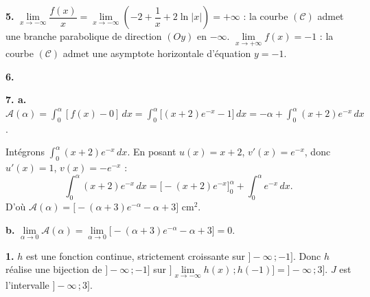 \documentclass[11pt]{article}
\begin{document}
\textbf{5.} $\lim\limits_{x\to-\infty}\dfrac{f(x)}{x} = \lim\limits_{x\to-\infty}\left(-2 + \dfrac{1}{x} + 2\ln|x|\right) = +\infty$ : la courbe $(\mathscr{C})$ admet une branche parabolique de direction $(Oy)$ en $-\infty$. $\lim\limits_{x\to+\infty} f(x) = -1$ : la courbe $(\mathscr{C})$ admet une asymptote horizontale d'équation $y = -1$.

\textbf{6.}
\begin{center}
\end{center}

\textbf{7. a.} $\mathscr{A}(\alpha) = \displaystyle\int_0^\alpha [f(x) - 0]\,dx = \int_0^\alpha \big[(x+2)e^{-x} - 1\big]\,dx = -\alpha + \int_0^\alpha (x+2)e^{-x}\,dx$.

Intégrons $\displaystyle\int_0^\alpha (x+2)e^{-x}\,dx$. En posant $u(x) = x + 2$, $v'(x) = e^{-x}$, donc $u'(x) = 1$, $v(x) = -e^{-x}$ :
\[ \int_0^\alpha (x+2)e^{-x}\,dx = \Big[-(x+2)e^{-x}\Big]_0^\alpha + \int_0^\alpha e^{-x}\,dx. \]
D'où $\mathscr{A}(\alpha) = \Big[-(\alpha+3)e^{-\alpha} - \alpha + 3\Big]$ cm$^2$.

\textbf{b.} $\lim\limits_{\alpha\to 0}\mathscr{A}(\alpha) = \lim\limits_{\alpha\to 0}\big[-(\alpha+3)e^{-\alpha} - \alpha + 3\big] = 0$.

\textbf{1.} $h$ est une fonction continue, strictement croissante sur $]-\infty\,;-1]$. Donc $h$ réalise une bijection de $]-\infty\,;-1]$ sur $]\lim\limits_{x\to-\infty} h(x)\,;h(-1)] = ]-\infty\,;3]$. $J$ est l'intervalle $]-\infty\,;3]$.
\end{document}
